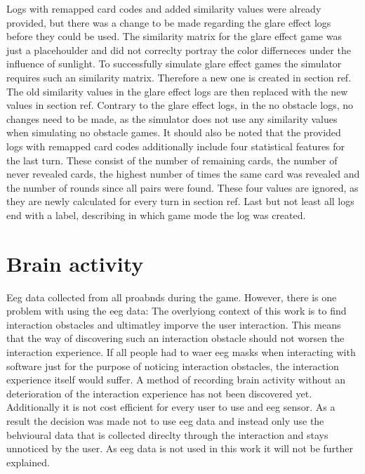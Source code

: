 Logs with remapped card codes and added similarity values were already provided, but there was a change to be made regarding the glare effect logs before they could be used. The similarity matrix for the glare effect game was just a placehoulder and did not correclty portray the color differneces under the influence of sunlight. To successfully simulate glare effect games the simulator requires such an similarity matrix. Therefore a new one is created in section ref. The old similarity values in the glare effect logs are then replaced with the new values in section ref. Contrary to the glare effect logs, in the no obstacle logs, no changes need to be made, as the simulator does not use any similarity values when simulating no obstacle games. It should also be noted that the provided logs with remapped card codes additionally include four statistical features for the last turn. These consist of the number of remaining cards, the number of never revealed cards, the highest number of times the same card was revealed and the number of rounds since all pairs were found. These four values are ignored, as they are newly calculated for every turn in section ref. Last but not least all logs end with a label, describing in which game mode the log was created. 




\section{Brain activity}
\label{brain_activity}
Eeg data collected from all proabnds during the game. However, there is one problem with using the eeg data: The overlyiong context of this work is to find interaction obstacles and ultimatley imporve the user interaction. This means that the way of discovering such an interaction obstacle should not worsen the interaction experience. If all people had to waer eeg masks when interacting with software just for the purpose of noticing interaction obstacles, the interaction experience itself would suffer. A method of recording brain activity without an deterioration of the interaction experience has not been discovered yet. Additionally it is not cost efficient for every user to use and eeg sensor. As a result the decision was made not to use eeg data and instead only use the behvioural data that is collected direclty through the interaction and stays unnoticed by the user. As eeg data is not used in this work it will not be further explained. 




